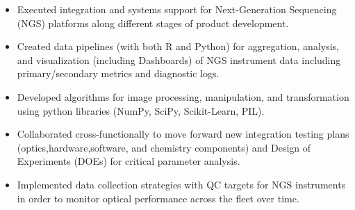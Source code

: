 \documentclass[10pt,a4paper]{altacv}
\begin{document}
\tagline{}

%

\begin{fullwidth}
\makecvheader
\end{fullwidth}

%





\begin{itemize}
    \setlength{\itemindent}{0.5em}
    \item   \small{Executed integration and systems support for Next-Generation Sequencing (NGS) platforms along different stages of product development.}
    \setlength{\itemindent}{0.5em}
    \item   \small{Created data pipelines (with both R and Python) for aggregation, analysis, and visualization (including Dashboards) of NGS instrument data including primary/secondary metrics and diagnostic logs.}
    \setlength{\itemindent}{0.5em}
    \item   \small{Developed algorithms for image processing, manipulation, and transformation using python libraries (NumPy, SciPy, Scikit-Learn, PIL).}
\end{itemize}

\medskip



\begin{itemize}
    \setlength{\itemindent}{0.5em}
    \item   \small{Collaborated cross-functionally to move forward new integration testing plans (optics,hardware,software, and chemistry components) and Design of Experiments (DOEs) for critical parameter analysis.}
    \setlength{\itemindent}{0.5em}
    \item   \small{Implemented data collection strategies with QC targets for NGS instruments in order to monitor optical performance across the fleet over time.}
\end{itemize}
\end{document}
